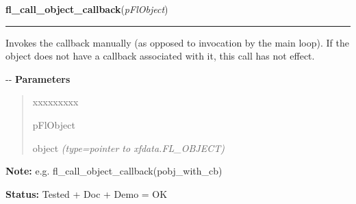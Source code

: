 \hspace{.8\funcindent}\begin{boxedminipage}{\funcwidth}

    \raggedright \textbf{fl\_call\_object\_callback}(\textit{pFlObject})

    \vspace{-1.5ex}

    \rule{\textwidth}{0.5\fboxrule}
\setlength{\parskip}{2ex}

Invokes the callback manually (as opposed to invocation by the main
loop). If the object does not have a callback associated with it, this
call has not effect.

-{}-
\setlength{\parskip}{1ex}
      \textbf{Parameters}
      \vspace{-1ex}

      \begin{quote}
        \begin{Ventry}{xxxxxxxxx}

          \item[pFlObject]


object
            {\it (type=pointer to xfdata.FL\_OBJECT)}

        \end{Ventry}

      \end{quote}

\textbf{Note:} 
e.g. fl\_call\_object\_callback(pobj\_with\_cb)


\textbf{Status:} 
Tested + Doc + Demo = OK


    \end{boxedminipage}

    \label{xformslib:flbasic:fl_set_object_prehandler}

    \vspace{0.5ex}

